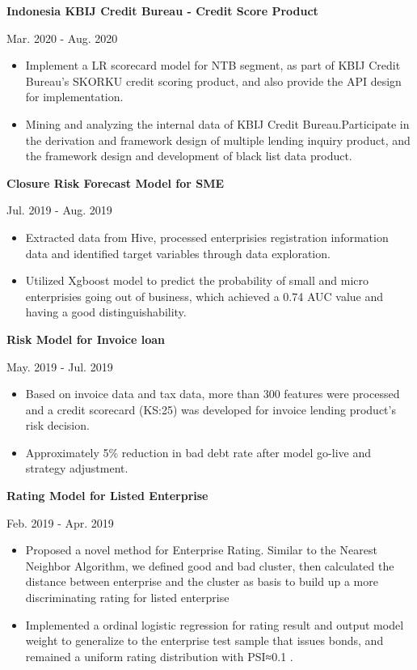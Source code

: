 \documentclass[letterpaper,10pt]{article}
\newcommand{\resumeItem}[2]{
  \item\small{
    \textbf{#1}{ #2 \vspace{-2pt}}
  }
}
\newcommand{\resumeSubItem}[2]{\resumeItem{#1}{#2}\vspace{-4pt}}
\begin{document}
\begin{CJK*}{UTF8}{gkai}
{\begin{itemize}
        \end{itemize}
     }

    \resumeSubItem{Indonesia KBIJ Credit Bureau - Credit Score Product}
        {   \hfill{Mar. 2020 - Aug. 2020}
        \vspace{-5pt}
        \begin{itemize}
            \item 
            Implement a LR scorecard model for NTB segment, as part of KBIJ Credit Bureau's SKORKU credit scoring product, and also provide the API design for implementation.
            \item Mining and analyzing the internal data of KBIJ Credit Bureau.Participate in the derivation and framework design of multiple lending inquiry product, and the framework design and development of black list data product.
            
        \end{itemize}
     }
    \resumeSubItem{Closure Risk Forecast Model for SME}
     {\vspace{-5pt} \hfill{Jul. 2019 - Aug. 2019}
        \begin{itemize}
            \item Extracted data from Hive, processed enterprisies registration information data and identified target variables through data exploration.
            \item Utilized Xgboost model to predict the probability of small and micro enterprisies going out of business, which achieved a 0.74 AUC value and having a good distinguishability.

        \end{itemize}
     }
    \resumeSubItem{Risk Model for Invoice loan}
     {\vspace{-5pt} \hfill{May. 2019 - Jul. 2019}
        \begin{itemize}
            \item Based on invoice data and tax data, more than 300 features were processed and a credit scorecard (KS:25) was developed for invoice lending product's risk decision.
            \item Approximately 5\% reduction in bad debt rate after model go-live and strategy adjustment.

        \end{itemize}
     }
    \resumeSubItem{Rating Model for Listed Enterprise}
    {  \hfill{Feb. 2019 - Apr. 2019}
       \vspace{-5pt}
        \begin{itemize}
            \item Proposed a novel method for Enterprise Rating. Similar to the Nearest Neighbor Algorithm, we defined good and bad cluster, then calculated the distance between enterprise and the cluster as basis to build up a more discriminating rating for listed enterprise
            \item Implemented a ordinal logistic regression for rating result and output model weight to generalize to the enterprise test sample that issues bonds, and remained a uniform rating distribution with PSI≈0.1 .
        \end{itemize}
    }
    

\end{CJK*}
\end{document}
